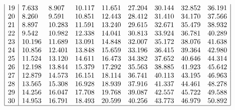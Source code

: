 \documentclass[svgnames, a5paper]{article}
\theoremstyle{definition}
\theoremstyle{remark}
\begin{document}
\begin{appendices}
\begin{gather*}
\begin{array}{|r|llllllll|}
19 & 7.633  & 8.907  & 10.117 & 11.651 & 27.204 & 30.144 & 32.852 & 36.191 \\
20 & 8.260  & 9.591  & 10.851 & 12.443 & 28.412 & 31.410 & 34.170 & 37.566 \\
21 & 8.897  & 10.283 & 11.591 & 13.240 & 29.615 & 32.671 & 35.479 & 38.932 \\
22 & 9.542  & 10.982 & 12.338 & 14.041 & 30.813 & 33.924 & 36.781 & 40.289 \\
23 & 10.196 & 11.689 & 13.091 & 14.848 & 32.007 & 35.172 & 38.076 & 41.638 \\
24 & 10.856 & 12.401 & 13.848 & 15.659 & 33.196 & 36.415 & 39.364 & 42.980 \\
25 & 11.524 & 13.120 & 14.611 & 16.473 & 34.382 & 37.652 & 40.646 & 44.314 \\
26 & 12.198 & 13.844 & 15.379 & 17.292 & 35.563 & 38.885 & 41.923 & 45.642 \\
27 & 12.879 & 14.573 & 16.151 & 18.114 & 36.741 & 40.113 & 43.195 & 46.963 \\
28 & 13.565 & 15.308 & 16.928 & 18.939 & 37.916 & 41.337 & 44.461 & 48.278 \\
29 & 14.256 & 16.047 & 17.708 & 19.768 & 39.087 & 42.557 & 45.722 & 49.588 \\
30 & 14.953 & 16.791 & 18.493 & 20.599 & 40.256 & 43.773 & 46.979 & 50.892 \\
\hline
\end{array}
\end{gather*}
\end{appendices}
\end{document}
